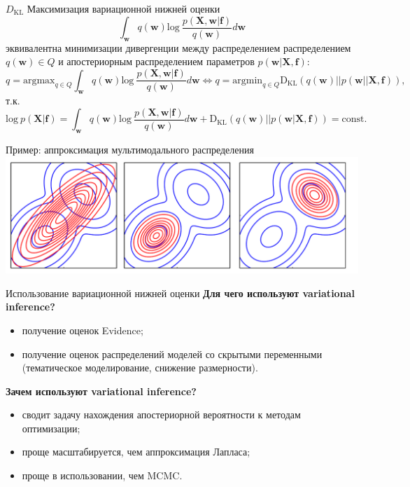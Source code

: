 \documentclass[10pt,pdf,utf8,russian,aspectratio=169]{beamer}
\begin{document}
\begin{frame}{$D_\text{KL}$}
Максимизация вариационной нижней оценки $$\int_{\mathbf{w}} q(\mathbf{w})\text{log}~\frac{p(\mathbf{X},\mathbf{w}|\mathbf{f})}{q(\mathbf{w})}d\mathbf{w}$$   эквивалентна минимизации дивергенции между распределением распределением $q(\mathbf{w}) \in Q$ и апостериорным распределением параметров $p(\mathbf{w}|\mathbf{X}, \mathbf{f})$:
\[
q = \text{argmax}_{q \in Q}\int_{\mathbf{w}} q(\mathbf{w})\text{log}~\frac{p(\mathbf{X},\mathbf{w}|\mathbf{f})}{q(\mathbf{w})}d\mathbf{w} \Leftrightarrow 	
q = \text{argmin}_{q \in Q} \text{D}_\text{KL}  (q(\mathbf{w})||p(\mathbf{w}|| \mathbf{X}, \mathbf{f})),
\]
т.к.
$$\text{log}~p(\mathbf{X}| \mathbf{f})  = \int_{\mathbf{w}} q(\mathbf{w})\text{log}~\frac{p(\mathbf{X},\mathbf{w}|\mathbf{f})}{q(\mathbf{w})}d\mathbf{w} + \text{D}_\text{KL}  (q(\mathbf{w})||p(\mathbf{w}| \mathbf{X}, \mathbf{f})) = \text{const}.$$

\end{frame}

\begin{frame}{Пример: аппроксимация мультимодального распределения}
\includegraphics[width=\textwidth]{bishop.png}
\end{frame}


\begin{frame}{Использование вариационной нижней оценки}
\textbf{Для чего используют variational inference?}
\begin{itemize}
\item получение оценок Evidence;
\item получение оценок распределений моделей со скрытыми переменными (тематическое моделирование, снижение размерности).
\end{itemize}

\textbf{Зачем используют variational inference?}
\begin{itemize}
\item сводит задачу нахождения апостериорной вероятности к методам оптимизации;
\item проще масштабируется, чем аппроксимация Лапласа;
\item проще в использовании, чем MCMC.
\end{itemize}
\end{frame}
\end{document}
